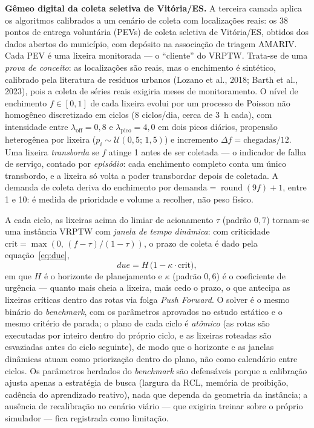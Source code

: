 \documentclass[10pt,a4paper]{article}
\begin{document}
\vspace{\baselineskip}
\textbf{Gêmeo digital da coleta seletiva de Vitória/ES.} A terceira camada aplica os algoritmos calibrados a um cenário de coleta com localizações reais: os 38 pontos de entrega voluntária (PEVs) de coleta seletiva de Vitória/ES, obtidos dos dados abertos do município, com depósito na associação de triagem AMARIV. Cada PEV é uma lixeira monitorada --- o ``cliente'' do VRPTW. Trata-se de uma \emph{prova de conceito}: as localizações são reais, mas o enchimento é sintético, calibrado pela literatura de resíduos urbanos (Lozano et al., 2018; Barth et al., 2023), pois a coleta de séries reais exigiria meses de monitoramento. O nível de enchimento $f\in[0,1]$ de cada lixeira evolui por um processo de Poisson não homogêneo discretizado em ciclos (8 ciclos/dia, cerca de 3~h cada), com intensidade entre $\lambda_{\mathrm{off}}=0{,}8$ e $\lambda_{\mathrm{pico}}=4{,}0$ em dois picos diários, propensão heterogênea por lixeira ($p_i\sim\mathcal{U}(0{,}5;\,1{,}5)$) e incremento $\Delta f=\text{chegadas}/12$. Uma lixeira \emph{transborda} se $f$ atinge 1 antes de ser coletada --- o indicador de falha de serviço, contado por \emph{episódio}: cada enchimento completo conta um único transbordo, e a lixeira só volta a poder transbordar depois de coletada. A demanda de coleta deriva do enchimento por $\mathrm{demanda}=\operatorname{round}(9f)+1$, entre 1 e 10: é medida de prioridade e volume a recolher, não peso físico.

\vspace{\baselineskip}
A cada ciclo, as lixeiras acima do limiar de acionamento $\tau$ (padrão $0{,}7$) tornam-se uma instância VRPTW com \emph{janela de tempo dinâmica}: com criticidade $\mathrm{crit}=\max(0,\,(f-\tau)/(1-\tau))$, o prazo de coleta é dado pela equação~\eqref{eq:due},
\begin{equation}
\mathit{due}=H\,\big(1-\kappa\cdot\mathrm{crit}\big),
\label{eq:due}
\end{equation}
em que $H$ é o horizonte de planejamento e $\kappa$ (padrão $0{,}6$) é o coeficiente de urgência --- quanto mais cheia a lixeira, mais cedo o prazo, o que antecipa as lixeiras críticas dentro das rotas via folga \textit{Push Forward}. O solver é o mesmo binário do \textit{benchmark}, com os parâmetros aprovados no estudo estático e o mesmo critério de parada; o plano de cada ciclo é \emph{atômico} (as rotas são executadas por inteiro dentro do próprio ciclo, e as lixeiras roteadas são esvaziadas antes do ciclo seguinte), de modo que o horizonte e as janelas dinâmicas atuam como priorização dentro do plano, não como calendário entre ciclos. Os parâmetros herdados do \textit{benchmark} são defensáveis porque a calibração ajusta apenas a estratégia de busca (largura da RCL, memória de proibição, cadência do aprendizado reativo), nada que dependa da geometria da instância; a ausência de recalibração no cenário viário --- que exigiria treinar sobre o próprio simulador --- fica registrada como limitação.
\end{document}
